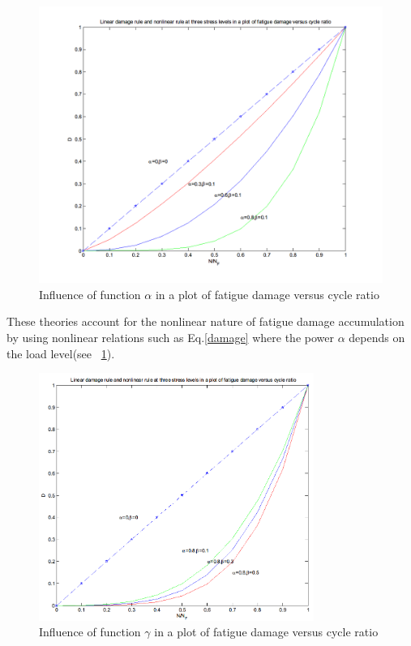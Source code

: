 \documentclass[3p,times,procedia,number]{elsarticle}
\newcommand{\figref}[1]{\figurename~\ref{#1}}
\begin{document}
\begin{figure}[h!]
	\centering
	\includegraphics[width=\textwidth]{figures//Dratio1.png}
	\vspace{-12pt}
	\caption{Influence of function $\alpha$ in a plot of fatigue damage versus cycle ratio}
	\label{Alpha}
\end{figure}
These theories account for the nonlinear nature of fatigue damage accumulation by using nonlinear relations such as Eq.\eqref{damage} where the power $\alpha$ depends on the load level(see \figref{Alpha}).


\begin{figure}[h!]
	\centering
	\includegraphics[width=0.8\textwidth]{figures//Dratio2.png}
	\vspace{-12pt}
	\caption{Influence of function $\gamma$ in a plot of fatigue damage versus cycle ratio}
\end{figure}
\end{document}
